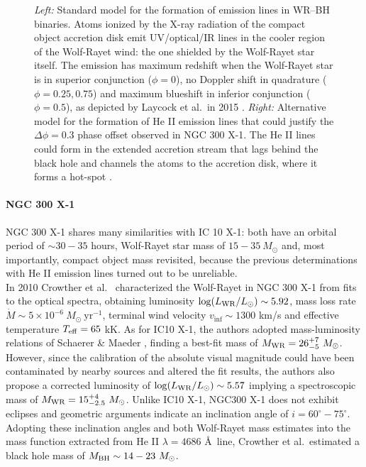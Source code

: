 \documentclass[a4paper,titlepage]{book}     	%
\newcommand{\sun}{\ensuremath{_\odot}}
\newcommand{\mdot}{\ensuremath{\dot{M}}}
\newcommand{\msun}{\ensuremath{M\sun}}
\newcommand{\lsun}{L_{\odot}}
\newcommand{\yr}{\text{yr}}
\newcommand{\mwr}{\ensuremath{M_\textup{WR}}}
\newcommand{\mbh}{\ensuremath{M_\textup{BH}}}
\begin{document}
\begin{figure}[t!]
\begin{minipage}{.60\textwidth}
	\end{minipage}
	\caption{\emph{Left:} Standard model for the formation of emission lines in WR--BH binaries. Atoms ionized by the X-ray radiation of the compact object accretion disk emit UV/optical/IR lines in the cooler region of the Wolf-Rayet wind: the one shielded by the Wolf-Rayet star itself. The emission has maximum redshift when the Wolf-Rayet star is in superior conjunction ($\phi = 0$), no Doppler shift in quadrature ($\phi = 0.25,0.75$) and maximum blueshift in inferior conjunction ($\phi = 0.5$), as depicted by Laycock et al.\ in 2015 \cite{ICX10X-1_Laycock2015_revisited}. \emph{Right:} Alternative model for the formation of He II emission lines that could justify the $\Delta \phi = 0.3$ phase offset observed in NGC 300 X-1. The He II lines could form in the extended accretion stream that lags behind the black hole and channels the atoms to the accretion disk, where it forms a hot-spot \cite{NGC300X-1_Binder2021_BHpreciso}.}\label{fig:WRBHwind}
\end{figure}


\paragraph{NGC 300 X-1} NGC 300 X-1 shares many similarities with IC 10 X-1: both have an orbital period of $\sim 30-35$ hours, Wolf-Rayet star mass of $15-35~\msun$ and, most importantly, compact object mass revisited, because the previous determinations with He II emission lines turned out to be unreliable.\\

In 2010 Crowther et al.\ \cite{NGC300X-1_Crowther2010} characterized the Wolf-Rayet in NGC 300 X-1 from fits to the optical spectra, obtaining luminosity $\log(L_{\rm WR}/\lsun) \sim 5.92$, mass loss rate $\mdot \sim 5 \times 10^{-6}~\msun~\yr^{-1}$, terminal wind velocity $v_{\inf} \sim 1300$ km/s and effective temperature $T_{\rm eff} = 65$ kK. As for IC10 X-1, the authors adopted mass-luminosity relations of Schaerer \& Maeder \cite{schaerer1992MLrelationWR}, finding a best-fit mass of $\mwr = 26_{-5}^{+7}~\msun$. However, since the calibration of the absolute visual magnitude could have been contaminated by nearby sources and altered the fit results, the authors also propose a corrected luminosity of $\log(L_{\rm WR}/\lsun) \sim 5.57$ implying a spectroscopic mass of $\mwr = 15_{-2.5}^{+4}~\msun$. Unlike IC10 X-1, NGC300 X-1 does not exhibit eclipses and geometric arguments indicate an inclination angle of $i=60^{\circ}-75^{\circ}$. Adopting these inclination angles and both Wolf-Rayet mass estimates into the mass function extracted from He II $\lambda=4686$ \AA~line, Crowther et al.\ estimated a black hole mass of $
\mbh \sim 14-23~\msun$.\\
\end{document}
